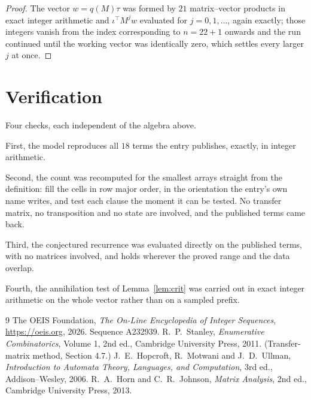 \documentclass[11pt,a4paper]{article}
\theoremstyle{plain}
\theoremstyle{definition}
\begin{document}
\begin{proof}
The vector $w=q(M)\tau$ was formed by $21$ matrix--vector products in exact integer
arithmetic and $\iota^{\!\top}M^{j}w$ evaluated for $j=0,1,\dots$, again exactly; those
integers vanish from the index corresponding to $n=22+1$ onwards and the run continued
until the working vector was identically zero, which settles every larger $j$ at once.
\end{proof}

\section{Verification}

Four checks, each independent of the algebra above.

First, the model reproduces all $18$ terms the entry publishes, exactly, in integer
arithmetic.

Second, the count was recomputed for the smallest arrays straight from the definition: fill the
cells in row major order, in the orientation the entry's own name writes, and test each clause
the moment it can be tested. No transfer matrix, no transposition and no state are involved,
and the published terms came back.

Third, the conjectured recurrence was evaluated directly on the published terms, with no
matrices involved, and holds wherever the proved range and the data overlap.

Fourth, the annihilation test of Lemma~\ref{lem:crit} was carried out in exact integer
arithmetic on the whole vector rather than on a sampled prefix.

\begin{thebibliography}{9}
 The OEIS Foundation, \emph{The On-Line Encyclopedia of Integer
Sequences}, \url{https://oeis.org}, 2026. Sequence A232939.
 R.~P.~Stanley, \emph{Enumerative Combinatorics}, Volume 1, 2nd ed.,
Cambridge University Press, 2011. (Transfer-matrix method, Section 4.7.)
 J.~E.~Hopcroft, R.~Motwani and J.~D.~Ullman, \emph{Introduction to Automata
Theory, Languages, and Computation}, 3rd ed., Addison--Wesley, 2006.
 R.~A.~Horn and C.~R.~Johnson, \emph{Matrix Analysis}, 2nd ed., Cambridge
University Press, 2013.
\end{thebibliography}
\end{document}
